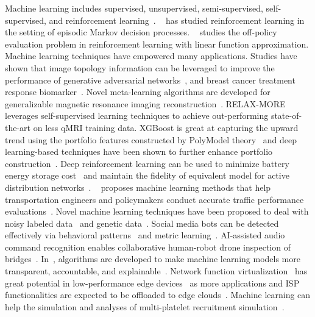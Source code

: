 Machine learning includes supervised, unsupervised, semi-supervised, self-supervised, and reinforcement learning~\cite{yifei2022,yifei2022path}.
~\cite{yifei2023} has studied reinforcement learning in the setting of episodic Markov decision processes.
~\cite{yifei2021} studies the off-policy evaluation problem in reinforcement learning with linear function approximation.
Machine learning techniques have empowered many applications.
Studies have shown that image topology information can be leveraged to improve the performance of generative adversarial networks~\cite{fan2020topogan},
and breast cancer treatment response biomarker~\cite{fan2021topotxr}.
Novel meta-learning algorithms are developed for generalizable magnetic resonance imaging reconstruction~\cite{wanyu_thesis}.
RELAX-MORE~\cite{wanyu2024} leverages self-supervised learning techniques to achieve out-performing state-of-the-art on less qMRI training data.
XGBoost is great at capturing the upward trend using the portfolio features constructed by PolyModel theory~\cite{siqiao2023} 
and deep learning-based techniques have been shown to further enhance portfolio construction~\cite{siqiao2024}.
Deep reinforcement learning can be used to minimize battery energy storage cost~\cite{binhuang2023grid} 
and maintain the fidelity of equivalent model for active distribution networks~\cite{binhuang2023renew}.
~\cite{xiaobo_thesis} proposes machine learning methods that help transportation engineers and policymakers conduct accurate traffic performance evaluations~\cite{xiaobo2020,xiaobo2021,xiaobo2023}.
Novel machine learning techniques have been proposed to deal with noisy labeled data~\cite{jinjin2023} and genetic data~\cite{jinjin_thesis}.
Social media bots can be detected effectively via behavioral patterns~\cite{wu2023botshape} and metric learning~\cite{wu2023bottrinet}.
AI-assisted audio command recognition enables collaborative human-robot drone inspection of bridges~\cite{yuli_thesis}.
In~\cite{ziheng_thesis,ziheng2022}, algorithms are developed to make machine learning models more transparent, accountable, and explainable~\cite{ziheng_relax,ziheng2023dark}.
Network function virtualization~\cite{wang2023thesis,wang2022quadrant,wang2020slos} has great potential in low-performance edge devices~\cite{wang2023scheduling}
as more applications and ISP functionalities are expected to be offloaded to edge clouds~\cite{wang2021galleon,wang2023pinolo}.
Machine learning can help the simulation and analyses of multi-platelet recruitment simulation~\cite{yicong_thesis}.
